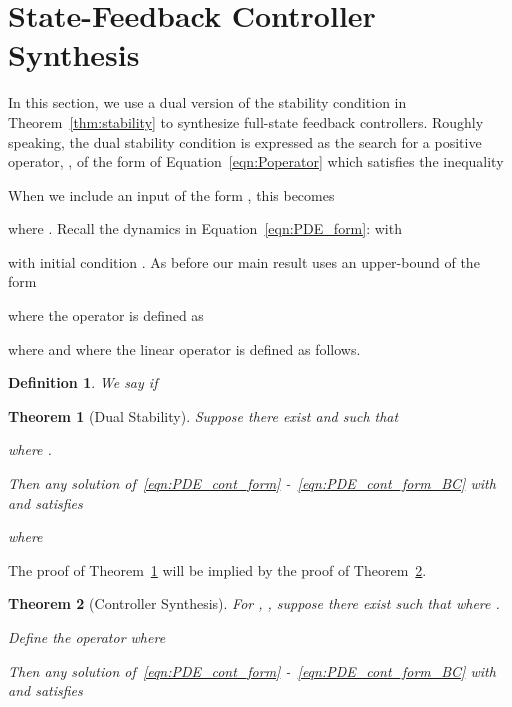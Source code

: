 \documentclass[9pt,journal,twocolumn]{IEEEtran}
\newtheorem{theorem}{Theorem}
\newtheorem{definition}{Definition}
\begin{document}
\section{State-Feedback Controller Synthesis}\label{sec:synthesis}


In this section, we use a dual version of the stability condition in Theorem~\ref{thm:stability} to synthesize full-state feedback controllers. Roughly speaking, the dual stability condition is expressed as the search for a positive operator, , of the form of Equation~\eqref{eqn:Poperator} which satisfies the inequality

When we include an input of the form , this becomes

where . Recall the dynamics in Equation~\eqref{eqn:PDE_form}:
 with

with initial condition .
As before our main result uses an upper-bound of the form

where the operator  is defined as

where  and where the linear operator  is defined as follows.
\begin{definition}
We say  if

\end{definition}
\begin{theorem}[Dual Stability]\label{thm:dualstability}
Suppose there exist   and  such that
 
where
.

Then any solution  of~\eqref{eqn:PDE_cont_form} -~\eqref{eqn:PDE_cont_form_BC} with  and  satisfies

where
 
 \end{theorem}
The proof of Theorem~\ref{thm:dualstability} will be implied by the proof of Theorem~\ref{thm:synthesis}.

\begin{theorem}[Controller Synthesis]\label{thm:synthesis}
For , , suppose there exist  such that
where
.

Define the operator  where

Then any solution  of~\eqref{eqn:PDE_cont_form} -~\eqref{eqn:PDE_cont_form_BC} with  and  satisfies

 \end{theorem}
\end{document}
